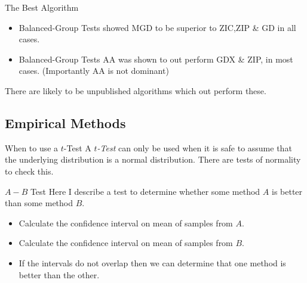 \documentclass[11pt,a4paper]{article}
\begin{document}
\begin{remark}{The Best Algorithm}
  \begin{itemize}
    \item Balanced-Group Tests showed MGD to be superior to ZIC,ZIP \& GD in all cases.
    \item Balanced-Group Tests AA was shown to out perform GDX \& ZIP, in most cases. (Importantly AA is not dominant)
  \end{itemize}
  There are likely to be unpublished algorithms which out perform these.
\end{remark}

\subsection{Empirical Methods}

\begin{remark}{When to use a $t$-Test}
  A \textit{$t$-Test} can only be used when it is safe to assume that the underlying distribution is a normal distribution. There are tests of normality to check this.
\end{remark}

\begin{proposition}{$A-B$ Test}
  Here I describe a test to determine whether some method $A$ is better than some method $B$.
  \begin{itemize}
    \item Calculate the confidence interval on mean of samples from $A$.
    \item Calculate the confidence interval on mean of samples from $B$.
    \item If the intervals do not overlap then we can determine that one method is better than the other.
  \end{itemize}
\end{proposition}
\end{document}
